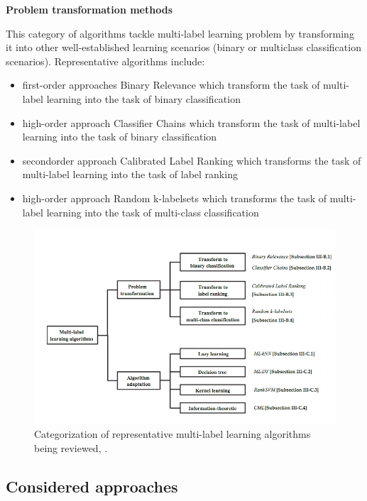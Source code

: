 \textbf{Problem transformation methods}

This category of algorithms tackle multi-label learning problem by transforming it into other well-established learning scenarios (binary or multiclass classification scenarios). 
Representative algorithms include:
\begin{itemize}
 \item first-order approaches Binary Relevance which transform the task of multi-label learning into the task of binary classification 
 \item high-order approach Classifier Chains which transform the task of multi-label learning into the task of binary classification 
 \item secondorder approach Calibrated Label Ranking which transforms the task of multi-label learning into the task of label ranking
 \item high-order approach Random k-labelsets which transforms the task of multi-label learning into the task of multi-class classification
\end{itemize}

\begin{figure}[H]
\centering
\includegraphics[scale=0.6]{./images/machine-learning/multi-label-approaches.png}
\caption{Categorization of representative multi-label learning algorithms being reviewed, \cite{MultilabelReview}.}
\label{fig:multilabelOverview}
\end{figure}


\subsection{Considered approaches}


